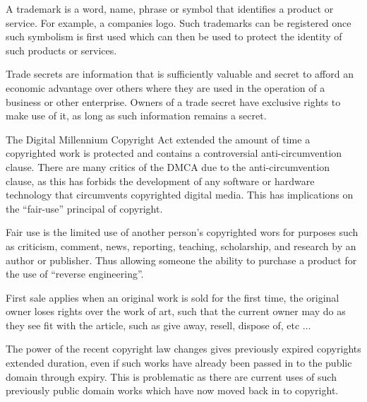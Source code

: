 A trademark is a word, name, phrase or symbol that identifies a product or service. For example, a companies logo. Such trademarks can be registered once such symbolism is first used which can then be used to protect the identity of such products or services.

Trade secrets are information that is sufficiently valuable and secret to afford an economic advantage over others where they are used in the operation of a business or other enterprise. Owners of a trade secret have exclusive rights to make use of it, as long as such information remains a secret.



The Digital Millennium Copyright Act extended the amount of time a copyrighted work is protected and contains a controversial anti-circumvention clause. There are many critics of the DMCA due to the anti-circumvention clause, as this has forbids the development of any software or hardware technology that circumvents copyrighted digital media. This has implications on the ``fair-use'' principal of copyright.



Fair use is the limited use of another person's copyrighted wors for purposes such as criticism, comment, news, reporting, teaching, scholarship, and research by an author or publisher. Thus allowing someone the ability to purchase a product for the use of ``reverse engineering''.

First sale applies when an original work is sold for the first time, the original owner loses rights over the work of art, such that the current owner may do as they see fit with the article, such as give away, resell, dispose of, etc $\ldots$



The power of the recent copyright law changes gives previously expired copyrights extended duration, even if such works have already been passed in to the public domain through expiry. This is problematic as there are current uses of such previously public domain works which have now moved back in to copyright.


